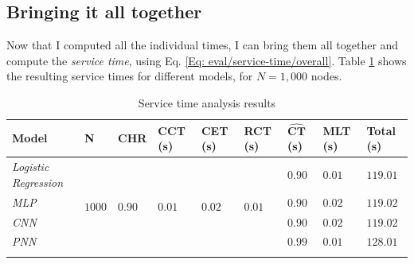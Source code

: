 			\subsection{Bringing it all together} \label{Section: eval/service-time/together}
			Now that I computed all the individual times, I can bring them all together and compute the \textit{service time}, using Eq. \ref{Eq: eval/service-time/overall}. Table \ref{Table: eval/service-time/together/overall} shows the resulting service times for different models, for $N=1,000$ nodes.
			\begin{longtable}{|p{}||p{.08\textwidth}|p{}|p{}|p{}|p{}|p{}|p{}||p{}|}
				\textbf{Model} & \textbf{N} & \textbf{CHR}  &\textbf{CCT} (s) & \textbf{CET} (s) & \textbf{RCT} (s)& $\mathbf{\hat{CT}}$ (s)& \textbf{MLT} (s) & \textbf{Total} (s)\\
				\hline
				\textit{Logistic Regression} & \multirow{5}{*}{$1000$} & \multirow{5}{*}{$0.90$} & \multirow{5}{*}{$0.01$} & \multirow{5}{*}{$0.02$} & \multirow{5}{*}{$0.01$} & $0.90$ & $0.01$ & \cellcolor{green!20} $\mathbf{119.01}$ \\
				\hhline{-~~~~---}
				\textit{MLP} &  &  &   & &  & $0.90$ & $0.02$ &\cellcolor{green!20} $\mathbf{119.02}$  \\
				\hhline{-~~~~---}
				\textit{CNN} &  &  &  & &  & $0.90$ & $0.02$ & \cellcolor{green!20} $\mathbf{119.02}$ \\
				\hhline{-~~~~---}
				\hhline{-~~~~---}
				\textit{PNN} &  &  &  & &  & $0.99$ & $0.01$ & \cellcolor{green!20} $\mathbf{128.01}$ \\
				\hline
				\caption{Service time analysis results}
				\label{Table: eval/service-time/together/overall}
			\end{longtable}
			

